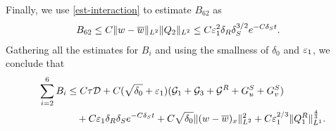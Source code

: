 \documentclass[11pt,reqno]{amsart}
\begin{document}
    Finally, we use \eqref{est-interaction} to estimate $B_{62}$ as
    \begin{align*}
     B_{62}
     &\le C \| w-\overline{w} \|_{L^2} \|Q_2\|_{L^2}\le C \varepsilon_1^{2} \delta_R \delta_S^{3/2} e^{-C \delta_S t}.
    \end{align*}
    Gathering all the estimates for $B_i$ and using the smallness of $\delta_0$ and $\varepsilon_1$, we conclude that
    \begin{equation}\label{est-B,K}
    \begin{aligned}
    \sum_{i=2}^6 B_i  &\le C\tau\mathcal{D} + C (\sqrt{\delta_0} + \varepsilon_1 ) (\mathcal{G}_1 + \mathcal{G}_3 + \mathcal{G}^R+ G^S_u + G^S_v ) \\
    & \quad +C \varepsilon_1 \delta_R \delta_S e^{-C \delta_S t} + C \sqrt{\delta_0} \| (w-\overline{w})_x\|_{L^2}^2 + C \varepsilon_1^{2/3}\| Q_1^R \|_{L^1}^{\frac{4}{3}}.
    \end{aligned}
    \end{equation}

    
\end{document}
